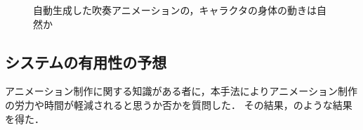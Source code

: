 \begin{figure}[h]
	\centering
	\caption{自動生成した吹奏アニメーションの，キャラクタの身体の動きは自然か}
	\label{fig:Q3-tb}
\end{figure}

\subsection{システムの有用性の予想}
アニメーション制作に関する知識がある者に，本手法によりアニメーション制作の労力や時間が軽減されると思うか否かを質問した．
その結果，のような結果を得た．